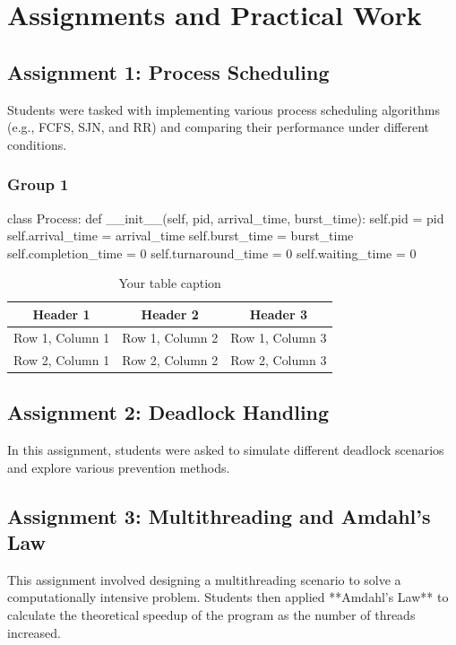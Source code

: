 \documentclass[12pt]{article}
\begin{document}
\section{Assignments and Practical Work}
\subsection{Assignment 1: Process Scheduling}
Students were tasked with implementing various process scheduling algorithms (e.g., FCFS, SJN, and RR) and comparing their performance under different conditions.
\subsubsection{Group 1}
\begin{python}
    class Process:
    def __init__(self, pid, arrival_time, burst_time):
        self.pid = pid
        self.arrival_time = arrival_time
        self.burst_time = burst_time
        self.completion_time = 0
        self.turnaround_time = 0
        self.waiting_time = 0
\end{python}

\begin{table}[htbp] %
    \centering
    \begin{tabular}{|c|c|c|} %
    \hline
    Header 1 & Header 2 & Header 3 \\ %
    \hline
    Row 1, Column 1 & Row 1, Column 2 & Row 1, Column 3 \\ %
    \hline
    Row 2, Column 1 & Row 2, Column 2 & Row 2, Column 3 \\ %
    \hline
    \end{tabular}
    \caption{Your table caption} %
    \label{tab:your_label} %
\end{table}

\subsection{Assignment 2: Deadlock Handling}
In this assignment, students were asked to simulate different deadlock scenarios and explore various prevention methods.

\subsection{Assignment 3: Multithreading and Amdahl's Law}
This assignment involved designing a multithreading scenario to solve a computationally intensive problem. Students then applied **Amdahl's Law** to calculate the theoretical speedup of the program as the number of threads increased.
\end{document}
